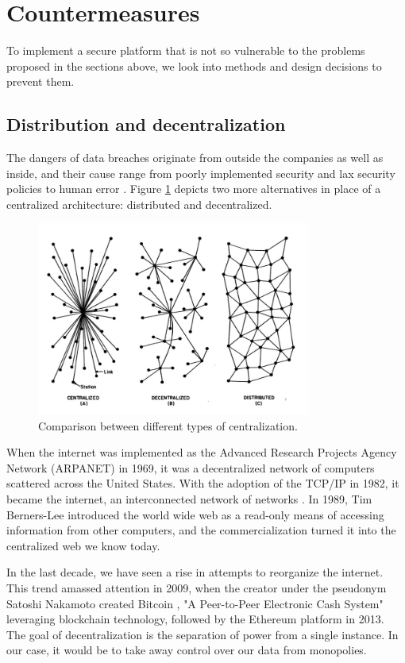 \section{Countermeasures}
To implement a secure platform that is not so vulnerable to the problems proposed in the sections above, we look into methods and design decisions to prevent them.
\subsection{Distribution and decentralization}
The dangers of data breaches originate from outside the companies as well as inside, and their cause range from poorly implemented security and lax security policies to human error \cite{helpnetsecurity}.
Figure \ref{fig:comparison} depicts two more alternatives in place of a centralized architecture: distributed and decentralized.

\begin{figure}[htpb]
  \centering
  \includegraphics[width=0.8\textwidth]{figures/comparison.jpg}
  \caption{Comparison between different types of centralization.} \label{fig:comparison}
\end{figure}

When the internet was implemented as the Advanced Research Projects Agency Network (ARPANET) in 1969, it was a decentralized network of computers scattered across the United States. With the adoption of the TCP/IP in 1982, it became the internet, an interconnected network of networks \cite{DBLP:books/daglib/0006297}.
In 1989, Tim Berners-Lee introduced the world wide web as a read-only means of accessing information from other computers, and the commercialization turned it into the centralized web we know today. 

In the last decade, we have seen a rise in attempts to reorganize the internet. This trend amassed attention in 2009, when the creator under the pseudonym Satoshi Nakamoto created Bitcoin \cite{bitcoin}, "A Peer-to-Peer Electronic Cash System" leveraging blockchain technology, followed by the Ethereum \cite{ethereum} platform in 2013.
The goal of decentralization is the separation of power from a single instance. In our case, it would be to take away control over our data from monopolies. 

